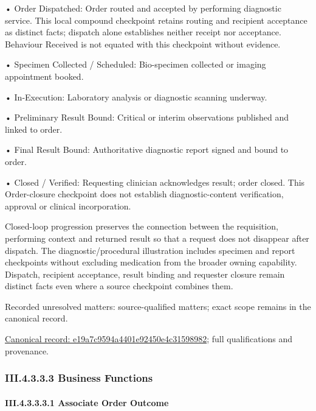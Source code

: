 •
Order Dispatched: Order routed and accepted by performing diagnostic service. This local compound checkpoint retains routing and recipient acceptance as distinct facts; dispatch alone establishes neither receipt nor acceptance. Behaviour Received is not equated with this checkpoint without evidence.



•
Specimen Collected / Scheduled: Bio-specimen collected or imaging appointment booked.



•
In-Execution: Laboratory analysis or diagnostic scanning underway.



•
Preliminary Result Bound: Critical or interim observations published and linked to order.



•
Final Result Bound: Authoritative diagnostic report signed and bound to order.



•
Closed / Verified: Requesting clinician acknowledges result; order closed. This Order-closure checkpoint does not establish diagnostic-content verification, approval or clinical incorporation.



Closed-loop progression preserves the connection between the requisition, performing context and returned result so that a request does not disappear after dispatch. The diagnostic/procedural illustration includes specimen and report checkpoints without excluding medication from the broader owning capability. Dispatch, recipient acceptance, result binding and requester closure remain distinct facts even where a source checkpoint combines them.


{\small Recorded unresolved matters: source-qualified matters; exact scope remains in the canonical record.}\par
{\footnotesize \href{../../../../../../../../continuum/business/business-process/e19a7c9594a4401e92450e4c31598982.md}{Canonical record: e19a7c9594a4401e92450e4c31598982}; full qualifications and provenance.}\par
\subsubsection*{III.4.3.3.3 Business Functions}
\label{navigation:III.4.3.3.3}

\paragraph*{III.4.3.3.3.1 Associate Order Outcome}
\label{navigation:III.4.3.3.3.1}

